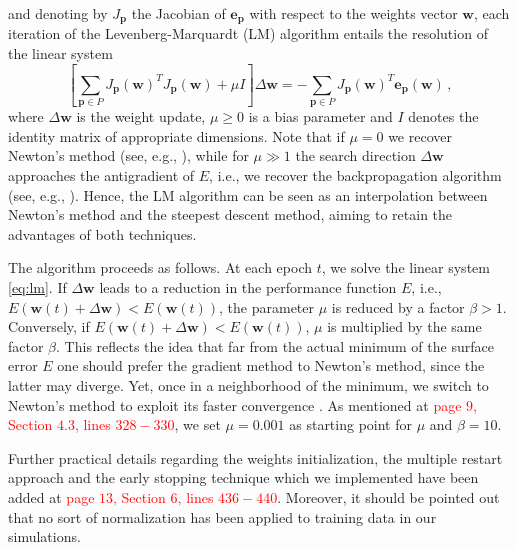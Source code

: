 \documentclass[longtitle]{elsarticle}
\theoremstyle{theorem}
\theoremstyle{definition}
\theoremstyle{remark}
\theoremstyle{proposition}
\numberwithin{figure}{section}
\begin{document}
\begin{enumerate}
			and denoting by $J_{\mathbf{p}}$ the Jacobian of $\mathbf{e}_{\mathbf{p}}$ with respect to the weights vector $\mathbf{w}$, each iteration of the Levenberg-Marquardt (LM) algorithm entails the resolution of the linear system
			\begin{equation}
				\label{eq:lm}
				\left[ \sum_{\mathbf{p} \in P} J_{\mathbf{p}}(\mathbf{w})^T J_{\mathbf{p}}(\mathbf{w}) + \mu I \right] \Delta \mathbf{w} = - \sum_{\mathbf{p} \in P} J_{\mathbf{p}}(\mathbf{w})^T \mathbf{e}_{\mathbf{p}}(\mathbf{w}) \, ,
			\end{equation}
			where $\Delta \mathbf{w}$ is the weight update, $\mu \geq 0$ is a bias parameter and $I$ denotes the identity matrix of appropriate dimensions. Note that if $\mu = 0$ we recover Newton's method (see, e.g., \cite{Hag94}), while for $\mu \gg 1$ the search direction $\Delta \mathbf{w}$ approaches the antigradient of $E$, i.e., we recover the backpropagation algorithm (see, e.g., \cite{Kri07}). Hence, the LM algorithm can be seen as an interpolation between Newton's method and the steepest descent method, aiming to retain the advantages of both techniques. 
			
			The algorithm proceeds as follows. At each epoch $t$, we solve the linear system \eqref{eq:lm}. If $\Delta \mathbf{w}$ leads to a reduction in the performance function $E$, i.e., $E(\mathbf{w}(t) + \Delta \mathbf{w}) < E(\mathbf{w}(t))$, the parameter $\mu$ is reduced by a factor $\beta > 1$. Conversely, if $E(\mathbf{w}(t) + \Delta \mathbf{w}) < E(\mathbf{w}(t))$, $\mu$ is multiplied by the same factor $\beta$. This reflects the idea that far from the actual minimum of the surface error $E$ one should prefer the gradient method to Newton's method, since the latter may diverge. Yet, once in a neighborhood of the minimum, we switch to Newton's method to exploit its faster convergence \cite{Mar63}. As mentioned at \textcolor{red}{page $9$, Section $4.3$, lines $328-330$}, we set $\mu = 0.001$ as starting point for $\mu$ and $\beta = 10$.

			Further practical details regarding the weights initialization, the multiple restart approach and the early stopping technique which we implemented have been added at \textcolor{red}{page $13$, Section $6$, lines $436-440$}. Moreover, it should be pointed out that no sort of normalization has been applied to training data in our simulations.  
			

\end{enumerate}
\end{document}
